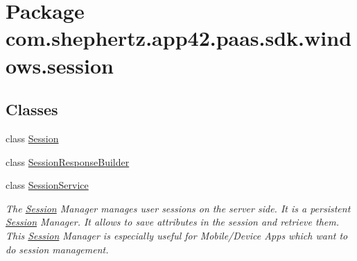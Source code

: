 \hypertarget{namespacecom_1_1shephertz_1_1app42_1_1paas_1_1sdk_1_1windows_1_1session}{\section{Package com.\+shephertz.\+app42.\+paas.\+sdk.\+windows.\+session}
\label{namespacecom_1_1shephertz_1_1app42_1_1paas_1_1sdk_1_1windows_1_1session}
}
\subsection*{Classes}
\begin{DoxyCompactItemize}
\item 
class \hyperlink{classcom_1_1shephertz_1_1app42_1_1paas_1_1sdk_1_1windows_1_1session_1_1_session}{Session}
\item 
class \hyperlink{classcom_1_1shephertz_1_1app42_1_1paas_1_1sdk_1_1windows_1_1session_1_1_session_response_builder}{Session\+Response\+Builder}
\item 
class \hyperlink{classcom_1_1shephertz_1_1app42_1_1paas_1_1sdk_1_1windows_1_1session_1_1_session_service}{Session\+Service}
\begin{DoxyCompactList}\small\item\em The \hyperlink{classcom_1_1shephertz_1_1app42_1_1paas_1_1sdk_1_1windows_1_1session_1_1_session}{Session} Manager manages user sessions on the server side. It is a persistent \hyperlink{classcom_1_1shephertz_1_1app42_1_1paas_1_1sdk_1_1windows_1_1session_1_1_session}{Session} Manager. It allows to save attributes in the session and retrieve them. This \hyperlink{classcom_1_1shephertz_1_1app42_1_1paas_1_1sdk_1_1windows_1_1session_1_1_session}{Session} Manager is especially useful for Mobile/\+Device Apps which want to do session management. \end{DoxyCompactList}\end{DoxyCompactItemize}
